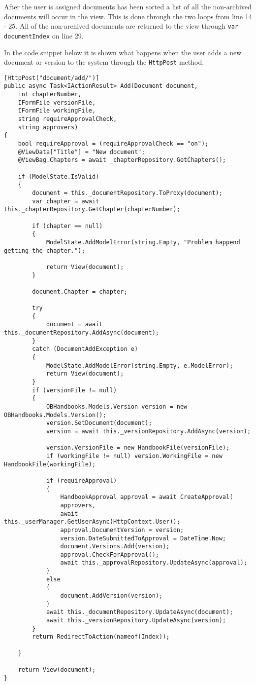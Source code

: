After the user is assigned documents has been sorted a list of all the non-archived documents will occur in the view.
This is done through the two loops from line 14 - 25.
All of the non-archived documents are returned to the view through \texttt{var documentIndex} on line 29.

In the code snippet below it is shown what happens when the user adds a new document or version to the system through the \texttt{HttpPost} method.
\\
\begin{lstlisting}[caption={Document Controller: Add}, label={lst:doccontrolleradd}]
[HttpPost("document/add/")]
public async Task<IActionResult> Add(Document document,
	int chapterNumber,
	IFormFile versionFile,
	IFormFile workingFile,
	string requireApprovalCheck,
	string approvers)
{
	bool requireApproval = (requireApprovalCheck == "on");
	@ViewData["Title"] = "New document";
	@ViewBag.Chapters = await _chapterRepository.GetChapters();

	if (ModelState.IsValid)
	{
		document = this._documentRepository.ToProxy(document);
		var chapter = await this._chapterRepository.GetChapter(chapterNumber);

		if (chapter == null)
		{
			ModelState.AddModelError(string.Empty, "Problem happend getting the chapter.");

			return View(document);
		}

		document.Chapter = chapter;

		try
		{
			document = await this._documentRepository.AddAsync(document);
		}
		catch (DocumentAddException e)
		{
			ModelState.AddModelError(string.Empty, e.ModelError);
			return View(document);
		}
		if (versionFile != null)
		{
			OBHandbooks.Models.Version version = new OBHandbooks.Models.Version();
			version.SetDocument(document);
			version = await this._versionRepository.AddAsync(version);

			version.VersionFile = new HandbookFile(versionFile);
			if (workingFile != null) version.WorkingFile = new HandbookFile(workingFile);

			if (requireApproval)
			{
				HandbookApproval approval = await CreateApproval(
				approvers,
				await this._userManager.GetUserAsync(HttpContext.User));
				approval.DocumentVersion = version;
				version.DateSubmittedToApproval = DateTime.Now;
				document.Versions.Add(version);
				approval.CheckForApproval();
				await this._approvalRepository.UpdateAsync(approval);
			}
			else
			{
				document.AddVersion(version);
			}
			await this._documentRepository.UpdateAsync(document);
			await this._versionRepository.UpdateAsync(version);
		}
		return RedirectToAction(nameof(Index));

	}

	return View(document);
}
\end{lstlisting}

